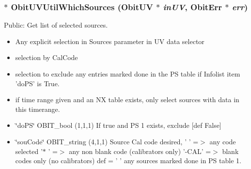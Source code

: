 \subsubsection{$\ast$ Obit\-UVUtil\-Which\-Sources ({\bf Obit\-UV} $\ast$ {\em in\-UV}, {\bf Obit\-Err} $\ast$ {\em err})}\label{ObitUVUtil_8h_a5}


Public: Get list of selected sources. 

\begin{itemize}
\item Any explicit selection in Sources parameter in UV data selector \item selection by Cal\-Code \item selection to exclude any entries marked done in the PS table if Infolist item 'do\-PS' is True. \item if time range given and an NX table exists, only select sources with data in this timerange. 
\item \char`\"{}do\-PS\char`\"{} OBIT\_\-bool (1,1,1) If true and PS 1 exists, exclude [def False] \item \char`\"{}sou\-Code\char`\"{} OBIT\_\-string (4,1,1) Source Cal code desired, ' ' =$>$ any code selected '$\ast$ ' =$>$ any non blank code (calibrators only) '-CAL' =$>$ blank codes only (no calibrators) def = ' ' any sources marked done in PS table 1. 
\end{itemize}
